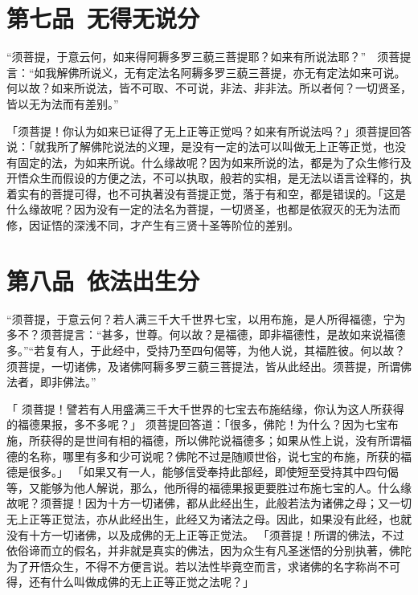 \documentclass[12pt,twoside,openany]{book}
\newcommand{\kai}[1]{{\CJKfamily{kai}#1}}
\begin{document}
\chapter{第七品\ 无得无说分}
“须菩提，于意云何，如来得阿耨多罗三藐三菩提耶？如来有所说法耶？”　须菩提言：“如我解佛所说义，无有定法名阿耨多罗三藐三菩提，亦无有定法如来可说。何以故？如来所说法，皆不可取、不可说，非法、非非法。所以者何？一切贤圣，皆以无为法而有差别。”

\kai{「须菩提！你认为如来已证得了无上正等正觉吗？如来有所说法吗？」须菩提回答说：「就我所了解佛陀说法的义理，是没有一定的法可以叫做无上正等正觉，也没有固定的法，为如来所说。什么缘故呢？因为如来所说的法，都是为了众生修行及开悟众生而假设的方便之法，不可以执取，般若的实相，是无法以语言诠释的，执着实有的菩提可得，也不可执著没有菩提正觉，落于有和空，都是错误的。「这是什么缘故呢？因为没有一定的法名为菩提，一切贤圣，也都是依寂灭的无为法而修，因证悟的深浅不同，才产生有三贤十圣等阶位的差别。}

\chapter{第八品\ 依法出生分}
“须菩提，于意云何？若人满三千大千世界七宝，以用布施，是人所得福德，宁为多不？须菩提言：“甚多，世尊。何以故？是福德，即非福德性，是故如来说福德多。”“若复有人，于此经中，受持乃至四句偈等，为他人说，其福胜彼。何以故？须菩提，一切诸佛，及诸佛阿耨多罗三藐三菩提法，皆从此经出。须菩提，所谓佛法者，即非佛法。”

\kai{「 须菩提！譬若有人用盛满三千大千世界的七宝去布施结缘，你认为这人所获得的福德果报，多不多呢？」 须菩提回答道：「很多，佛陀！为什么？因为七宝布施，所获得的是世间有相的福德，所以佛陀说福德多；如果从性上说，没有所谓福德的名称，哪里有多和少可说呢？佛陀不过是随顺世俗，说七宝的布施，所获的福德是很多。」 「如果又有一人，能够信受奉持此部经，即使短至受持其中四句偈等，又能够为他人解说，那么，他所得的福德果报更要胜过布施七宝的人。什么缘故呢？须菩提！因为十方一切诸佛，都从此经出生，此般若法为诸佛之母；又一切无上正等正觉法，亦从此经出生，此经又为诸法之母。因此，如果没有此经，也就没有十方一切诸佛，以及成佛的无上正等正觉法。 「须菩提！所谓的佛法，不过依俗谛而立的假名，并非就是真实的佛法，因为众生有凡圣迷悟的分别执著，佛陀为了开悟众生，不得不方便言说。若以法性毕竟空而言，求诸佛的名字称尚不可得，还有什么叫做成佛的无上正等正觉之法呢？」}
\end{document}

